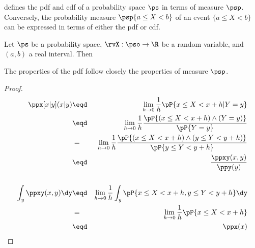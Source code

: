  defines the pdf and cdf of a probability space
$\ps$ in terms of measure $\psp$.
Conversely, the probability measure $\psp\{a\le X<b\}$
of an event $\{a\le X<b\}$ can be
expressed in terms of either the pdf or cdf.
\begin{theorem}
Let $\ps$ be a probability space,
$\rvX:\pso\to\R$ be a random variable, and $(a,b)$ a real interval.
Then
\end{theorem}

The properties of the pdf follow closely the properties of measure $\psp$.
\begin{theorem}
\end{theorem}
\begin{proof}
\begin{eqnarray*}
  \ppx[x|y](x|y)
    &\eqd& \lim_{h\to0} \frac{1}{h} \pP{x\le X < x+h | Y=y}
  \\&\eqd& \lim_{h\to0} \frac{1}{h} \frac{\pP{(x\le X < x+h) \land (Y=y)}}{\pP{Y=y}}
  \\&=&    \lim_{h\to0} \frac{1}{h} \frac{\pP{(x\le X < x+h) \land (y\le Y<y+h)}}{\pP{y\le Y<y+h}}
  \\&\eqd& \frac{\ppxy(x,y)}{\ppy(y)}
\\
\\
  \int_y\ppxy(x,y)\dy
    &\eqd& \lim_{h\to0} \frac{1}{h}
           \int_y \pP{x\le X<x+h, y\le Y<y+h} \dy
  \\&=&    \lim_{h\to0} \frac{1}{h} \pP{x\le X<x+h}
  \\&\eqd& \ppx(x)
\end{eqnarray*}
\end{proof}
